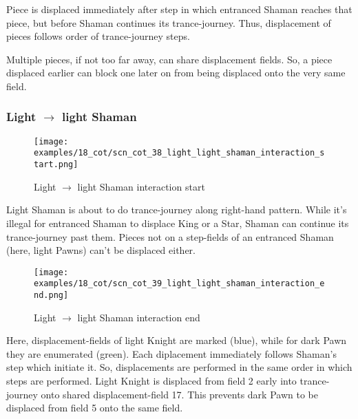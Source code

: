 Piece is displaced immediately after step in which entranced Shaman reaches that
piece, but before Shaman continues its trance-journey. Thus, displacement of pieces
follows order of trance-journey steps.

Multiple pieces, if not too far away, can share displacement fields. So, a piece
displaced earlier can block one later on from being displaced onto the very same
field.

\clearpage %

\subsubsection*{Light $\rightarrow$ light Shaman}
\label{sec:Conquest of Tlalocan/Trance-journey/Interactions/Light --> light Shaman}

\vspace*{-1.2\baselineskip}
\noindent
\begin{figure}[!h]
\texttt{[image: examples/18\_cot/scn\_cot\_38\_light\_light\_shaman\_interaction\_start.png]}
\caption{Light $\rightarrow$ light Shaman interaction start}
\label{fig:scn_cot_38_light_light_shaman_interaction_start}
\end{figure}

Light Shaman is about to do trance-journey along right-hand pattern. While it's
illegal for entranced Shaman to displace King or a Star, Shaman can continue its
trance-journey past them. Pieces not on a step-fields of an entranced Shaman (here,
light Pawns) can't be displaced either.

\clearpage %

\noindent
\begin{figure}[!h]
\texttt{[image: examples/18\_cot/scn\_cot\_39\_light\_light\_shaman\_interaction\_end.png]}
\caption{Light $\rightarrow$ light Shaman interaction end}
\label{fig:scn_cot_39_light_light_shaman_interaction_end}
\end{figure}

Here, displacement-fields of light Knight are marked (blue), while for dark Pawn
they are enumerated (green). Each diplacement immediately follows Shaman's step
which initiate it. So, displacements are performed in the same order in which steps
are performed. Light Knight is displaced from field 2 early into trance-journey
onto shared displacement-field 17. This prevents dark Pawn to be displaced from
field 5 onto the same field.

